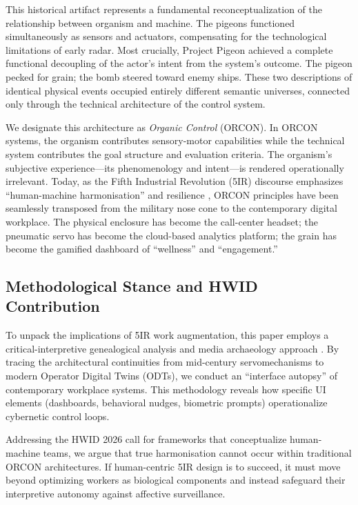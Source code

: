 \documentclass[11pt, a4paper]{article}
\begin{document}
This historical artifact represents a fundamental reconceptualization of the relationship between organism and machine. The pigeons functioned simultaneously as sensors and actuators, compensating for the technological limitations of early radar. Most crucially, Project Pigeon achieved a complete functional decoupling of the actor's intent from the system's outcome. The pigeon pecked for grain; the bomb steered toward enemy ships. These two descriptions of identical physical events occupied entirely different semantic universes, connected only through the technical architecture of the control system.

We designate this architecture as \textit{Organic Control} (ORCON). In ORCON systems, the organism contributes sensory-motor capabilities while the technical system contributes the goal structure and evaluation criteria. The organism's subjective experience---its phenomenology and intent---is rendered operationally irrelevant. Today, as the Fifth Industrial Revolution (5IR) discourse emphasizes ``human-machine harmonisation'' and resilience \cite{industry50_2021}, ORCON principles have been seamlessly transposed from the military nose cone to the contemporary digital workplace. The physical enclosure has become the call-center headset; the pneumatic servo has become the cloud-based analytics platform; the grain has become the gamified dashboard of ``wellness'' and ``engagement.''

\subsection{Methodological Stance and HWID Contribution}
To unpack the implications of 5IR work augmentation, this paper employs a critical-interpretive genealogical analysis and media archaeology approach \cite{foucault1977, parikka2012}. By tracing the architectural continuities from mid-century servomechanisms to modern Operator Digital Twins (ODTs), we conduct an ``interface autopsy'' of contemporary workplace systems. This methodology reveals how specific UI elements (dashboards, behavioral nudges, biometric prompts) operationalize cybernetic control loops.

Addressing the HWID 2026 call for frameworks that conceptualize human-machine teams, we argue that true harmonisation cannot occur within traditional ORCON architectures. If human-centric 5IR design is to succeed, it must move beyond optimizing workers as biological components and instead safeguard their interpretive autonomy against affective surveillance.
\end{document}
